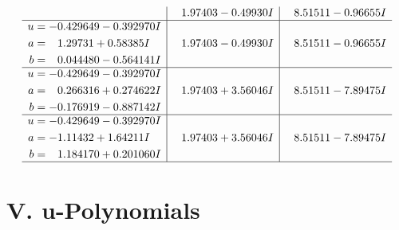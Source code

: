 \documentclass[1p]{elsarticle_modified}
\theoremstyle{definition}
\begin{document}
$$\begin{array}{c|c|c}
 & \phantom{-}1.97403 - 0.49930 I & \phantom{-}8.51511 - 0.96655 I \\ \hline\begin{aligned}
u &= -0.429649 - 0.392970 I \\
a &= \phantom{-}1.29731 + 0.58385 I \\
b &= \phantom{-}0.044480 - 0.564141 I\end{aligned}
 & \phantom{-}1.97403 - 0.49930 I & \phantom{-}8.51511 - 0.96655 I \\ \hline\begin{aligned}
u &= -0.429649 - 0.392970 I \\
a &= \phantom{-}0.266316 + 0.274622 I \\
b &= -0.176919 - 0.887142 I\end{aligned}
 & \phantom{-}1.97403 + 3.56046 I & \phantom{-}8.51511 - 7.89475 I \\ \hline\begin{aligned}
u &= -0.429649 - 0.392970 I \\
a &= -1.11432 + 1.64211 I \\
b &= \phantom{-}1.184170 + 0.201060 I\end{aligned}
 & \phantom{-}1.97403 + 3.56046 I & \phantom{-}8.51511 - 7.89475 I\\
 \hline 
 \end{array}$$\newpage
\newpage\renewcommand{\arraystretch}{1}
\centering \section*{ V. u-Polynomials}
\end{document}
